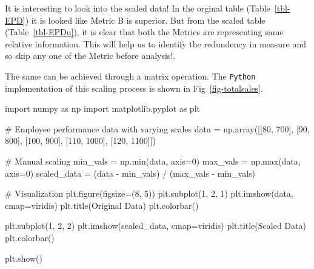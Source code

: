 \documentclass[
  letterpaper,
  DIV=11,
  numbers=noendperiod]{scrreprt}
\newenvironment{Shaded}{\begin{snugshade}}{\end{snugshade}}
\newcommand{\BuiltInTok}[1]{\textcolor[rgb]{0.00,0.23,0.31}{#1}}
\newcommand{\CommentTok}[1]{\textcolor[rgb]{0.37,0.37,0.37}{#1}}
\newcommand{\DecValTok}[1]{\textcolor[rgb]{0.68,0.00,0.00}{#1}}
\newcommand{\ImportTok}[1]{\textcolor[rgb]{0.00,0.46,0.62}{#1}}
\newcommand{\NormalTok}[1]{\textcolor[rgb]{0.00,0.23,0.31}{#1}}
\newcommand{\OperatorTok}[1]{\textcolor[rgb]{0.37,0.37,0.37}{#1}}
\newcommand{\StringTok}[1]{\textcolor[rgb]{0.13,0.47,0.30}{#1}}
\theoremstyle{plain}
\theoremstyle{definition}
\theoremstyle{remark}
\begin{document}
It is interesting to look into the scaled data! In the orginal table
(Table~\ref{tbl-EPD}) it is looked like Metric B is superior. But from
the scaled table (Table~\ref{tbl-EPDu}), it is clear that both the
Metrics are representing same relative information. This will help us to
identify the redundency in measure and so skip any one of the Metric
before analysis!.

The same can be achieved through a matrix operation. The \texttt{Python}
implementation of this scaling process is shown in
Fig~\ref{fig-totalsales}.

\begin{Shaded}
\begin{Highlighting}[]
\ImportTok{import}\NormalTok{ numpy }\ImportTok{as}\NormalTok{ np}
\ImportTok{import}\NormalTok{ matplotlib.pyplot }\ImportTok{as}\NormalTok{ plt}

\CommentTok{\# Employee performance data with varying scales}
\NormalTok{data }\OperatorTok{=}\NormalTok{ np.array([[}\DecValTok{80}\NormalTok{, }\DecValTok{700}\NormalTok{], [}\DecValTok{90}\NormalTok{, }\DecValTok{800}\NormalTok{], [}\DecValTok{100}\NormalTok{, }\DecValTok{900}\NormalTok{], [}\DecValTok{110}\NormalTok{, }\DecValTok{1000}\NormalTok{], [}\DecValTok{120}\NormalTok{, }\DecValTok{1100}\NormalTok{]])}

\CommentTok{\# Manual scaling}
\NormalTok{min\_vals }\OperatorTok{=}\NormalTok{ np.}\BuiltInTok{min}\NormalTok{(data, axis}\OperatorTok{=}\DecValTok{0}\NormalTok{)}
\NormalTok{max\_vals }\OperatorTok{=}\NormalTok{ np.}\BuiltInTok{max}\NormalTok{(data, axis}\OperatorTok{=}\DecValTok{0}\NormalTok{)}
\NormalTok{scaled\_data }\OperatorTok{=}\NormalTok{ (data }\OperatorTok{{-}}\NormalTok{ min\_vals) }\OperatorTok{/}\NormalTok{ (max\_vals }\OperatorTok{{-}}\NormalTok{ min\_vals)}

\CommentTok{\# Visualization}
\NormalTok{plt.figure(figsize}\OperatorTok{=}\NormalTok{(}\DecValTok{8}\NormalTok{, }\DecValTok{5}\NormalTok{))}
\NormalTok{plt.subplot(}\DecValTok{1}\NormalTok{, }\DecValTok{2}\NormalTok{, }\DecValTok{1}\NormalTok{)}
\NormalTok{plt.imshow(data, cmap}\OperatorTok{=}\StringTok{\textquotesingle{}viridis\textquotesingle{}}\NormalTok{)}
\NormalTok{plt.title(}\StringTok{\textquotesingle{}Original Data\textquotesingle{}}\NormalTok{)}
\NormalTok{plt.colorbar()}

\NormalTok{plt.subplot(}\DecValTok{1}\NormalTok{, }\DecValTok{2}\NormalTok{, }\DecValTok{2}\NormalTok{)}
\NormalTok{plt.imshow(scaled\_data, cmap}\OperatorTok{=}\StringTok{\textquotesingle{}viridis\textquotesingle{}}\NormalTok{)}
\NormalTok{plt.title(}\StringTok{\textquotesingle{}Scaled Data\textquotesingle{}}\NormalTok{)}
\NormalTok{plt.colorbar()}

\NormalTok{plt.show()}
\end{Highlighting}
\end{Shaded}
\end{document}

